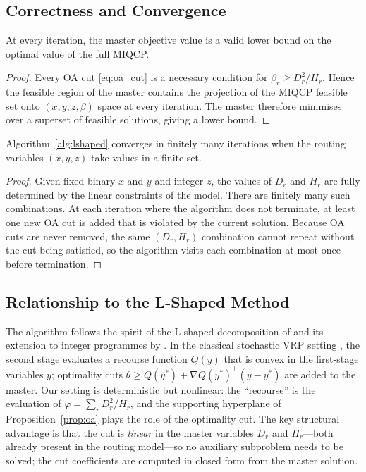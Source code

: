 \subsection{Correctness and Convergence}

\begin{theorem}
At every iteration, the master objective value is a valid lower bound
on the optimal value of the full MIQCP.
\end{theorem}

\begin{proof}
Every OA cut \eqref{eq:oa_cut} is a necessary condition for
$\beta_r \geq D_r^2/H_r$.  Hence the feasible region of the master
contains the projection of the MIQCP feasible set onto $(x,y,z,\beta)$
space at every iteration.  The master therefore minimises over a
superset of feasible solutions, giving a lower bound.
\end{proof}

\begin{theorem}
Algorithm~\ref{alg:lshaped} converges in finitely many iterations
when the routing variables $(x,y,z)$ take values in a finite set.
\end{theorem}

\begin{proof}
Given fixed binary $x$ and $y$ and integer $z$, the values of $D_r$
and $H_r$ are fully determined by the linear constraints of the
model.  There are finitely many such combinations.  At each iteration
where the algorithm does not terminate, at least one new OA cut is
added that is violated by the current solution.  Because OA cuts are
never removed, the same $(D_r,H_r)$ combination cannot repeat without
the cut being satisfied, so the algorithm visits each combination at
most once before termination.
\end{proof}

\subsection{Relationship to the L-Shaped Method}

The algorithm follows the spirit of the L-shaped decomposition of
\citet{VanSlyke1969} and its extension to integer programmes by
\citet{Laporte1993}.  In the classical stochastic VRP setting
\citep{Laporte1993,Laporte2002}, the second stage evaluates a
recourse function $Q(y)$ that is convex in the first-stage variables
$y$; optimality cuts $\theta \geq Q(y^*)+ \nabla Q(y^*)^\top(y-y^*)$
are added to the master.  Our setting is deterministic but nonlinear:
the ``recourse'' is the evaluation of $\varphi = \sum_r D_r^2/H_r$,
and the supporting hyperplane of Proposition~\ref{prop:oa} plays the
role of the optimality cut.  The key structural advantage is that the
cut is \emph{linear} in the master variables $D_r$ and $H_r$—both
already present in the routing model—so no auxiliary subproblem needs
to be solved; the cut coefficients are computed in closed form from the
master solution.

